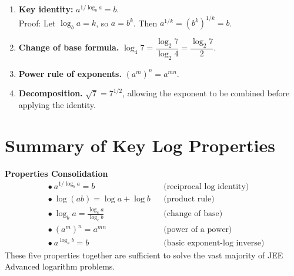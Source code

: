 \documentclass[12pt]{article}
\begin{document}
\begin{propbox}
\begin{enumerate}[leftmargin=*, label=\textbf{P\arabic*.}]
  \item \textbf{Key identity:} $a^{1/\log_b a} = b$.\\
  Proof: Let $\log_b a = k$, so $a = b^k$. Then $a^{1/k} = (b^k)^{1/k} = b$.

  \item \textbf{Change of base formula.}  
  $\log_4 7 = \dfrac{\log_2 7}{\log_2 4} = \dfrac{\log_2 7}{2}$.

  \item \textbf{Power rule of exponents.}  
  $(a^m)^n = a^{mn}$.

  \item \textbf{Decomposition.}  
  $\sqrt{7} = 7^{1/2}$, allowing the exponent to be combined before applying the identity.
\end{enumerate}
\end{propbox}

\section*{Summary of Key Log Properties}

\begin{mdframed}[backgroundcolor=boxbg, linecolor=problemblue, linewidth=1pt]
\textbf{Properties Consolidation}
\begin{align*}
&\bullet\ a^{1/\log_b a} = b && \text{(reciprocal log identity)}\\
&\bullet\ \log(ab) = \log a + \log b && \text{(product rule)}\\
&\bullet\ \log_b a = \frac{\log_c a}{\log_c b} && \text{(change of base)}\\
&\bullet\ (a^m)^n = a^{mn} && \text{(power of a power)}\\
&\bullet\ a^{\log_a b} = b && \text{(basic exponent-log inverse)}
\end{align*}
These five properties together are sufficient to solve the vast majority of JEE Advanced logarithm problems.
\end{mdframed}
\end{document}

